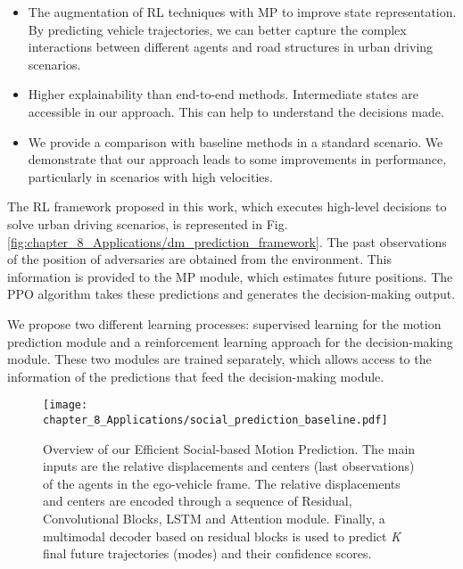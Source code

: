 \begin{itemize}
	\item The augmentation of RL techniques with MP to improve state representation. By predicting vehicle trajectories, we can better capture the complex interactions between different agents and road structures in urban driving scenarios. 
	
	\item Higher explainability than end-to-end methods. Intermediate states are accessible in our approach. This can help to understand the decisions made.
	
	\item We provide a comparison with baseline methods in a standard scenario. We demonstrate that our approach leads to some improvements in performance, particularly in scenarios with high velocities.
\end{itemize}
	
The RL framework proposed in this work, which executes high-level decisions to solve urban driving scenarios, is represented in Fig. \ref{fig:chapter_8_Applications/dm_prediction_framework}. The past observations of the position of adversaries are obtained from the environment. This information is provided to the MP module, which estimates future positions. The PPO algorithm takes these predictions and generates the decision-making output.

We propose two different learning processes: supervised learning for the motion prediction module and a reinforcement learning approach for the decision-making module. These two modules are trained separately, which allows access to the information of the predictions that feed the decision-making module.

\begin{figure}[h]
	\centering
	\setlength{\tabcolsep}{2.0pt}
	\texttt{[image: chapter\_8\_Applications/social\_prediction\_baseline.pdf]}
	\caption{Overview of our Efficient Social-based Motion Prediction. The main inputs are the relative displacements and centers (last observations) of the agents in the ego-vehicle frame. The relative displacements and centers are encoded through a sequence of Residual, Convolutional Blocks, LSTM and Attention module. Finally, a multimodal decoder based on residual blocks is used to predict \textit{K} final future trajectories (modes) and their confidence scores.}
	
	\label{fig:chapter_8_Applications/social_prediction_baseline}
\end{figure}

